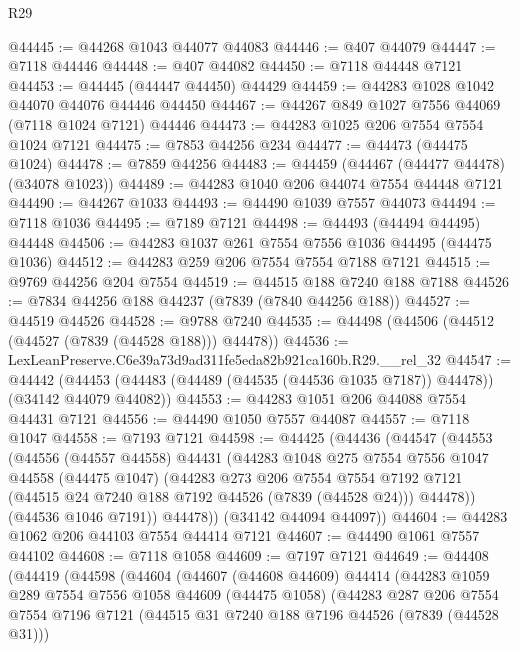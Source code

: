 \begin{lexlean}{R29}
\begin{coremodule}
@44445 := @44268 @1043 @44077 @44083
@44446 := @407 @44079
@44447 := @7118 @44446
@44448 := @407 @44082
@44450 := @7118 @44448 @7121
@44453 := @44445 (@44447 @44450) @44429
@44459 := @44283 @1028 @1042 @44070 @44076 @44446 @44450
@44467 := @44267 @849 @1027 @7556 @44069 (@7118 @1024 @7121) @44446
@44473 := @44283 @1025 @206 @7554 @7554 @1024 @7121
@44475 := @7853 @44256 @234
@44477 := @44473 (@44475 @1024)
@44478 := @7859 @44256
@44483 := @44459 (@44467 (@44477 @44478) (@34078 @1023))
@44489 := @44283 @1040 @206 @44074 @7554 @44448 @7121
@44490 := @44267 @1033
@44493 := @44490 @1039 @7557 @44073
@44494 := @7118 @1036
@44495 := @7189 @7121
@44498 := @44493 (@44494 @44495) @44448
@44506 := @44283 @1037 @261 @7554 @7556 @1036 @44495 (@44475 @1036)
@44512 := @44283 @259 @206 @7554 @7554 @7188 @7121
@44515 := @9769 @44256 @204 @7554
@44519 := @44515 @188 @7240 @188 @7188
@44526 := @7834 @44256 @188 @44237 (@7839 (@7840 @44256 @188))
@44527 := @44519 @44526
@44528 := @9788 @7240
@44535 := @44498 (@44506 (@44512 (@44527 (@7839 (@44528 @188))) @44478))
@44536 := LexLeanPreserve.C6e39a73d9ad311fe5eda82b921ca160b.R29.__rel_32
@44547 := @44442
    (@44453 (@44483 (@44489 (@44535 (@44536 @1035 @7187)) @44478)) (@34142 @44079 @44082))
@44553 := @44283 @1051 @206 @44088 @7554 @44431 @7121
@44556 := @44490 @1050 @7557 @44087
@44557 := @7118 @1047
@44558 := @7193 @7121
@44598 := @44425
    (@44436
      (@44547
        (@44553
          (@44556
            (@44557 @44558)
            @44431
            (@44283
              @1048
              @275
              @7554
              @7556
              @1047
              @44558
              (@44475 @1047)
              (@44283
                @273
                @206
                @7554
                @7554
                @7192
                @7121
                (@44515 @24 @7240 @188 @7192 @44526 (@7839 (@44528 @24)))
                @44478))
            (@44536 @1046 @7191))
          @44478))
      (@34142 @44094 @44097))
@44604 := @44283 @1062 @206 @44103 @7554 @44414 @7121
@44607 := @44490 @1061 @7557 @44102
@44608 := @7118 @1058
@44609 := @7197 @7121
@44649 := @44408
    (@44419
      (@44598
        (@44604
          (@44607
            (@44608 @44609)
            @44414
            (@44283
              @1059
              @289
              @7554
              @7556
              @1058
              @44609
              (@44475 @1058)
              (@44283
                @287
                @206
                @7554
                @7554
                @7196
                @7121
                (@44515 @31 @7240 @188 @7196 @44526 (@7839 (@44528 @31)))

\end{coremodule}
\end{lexlean}
